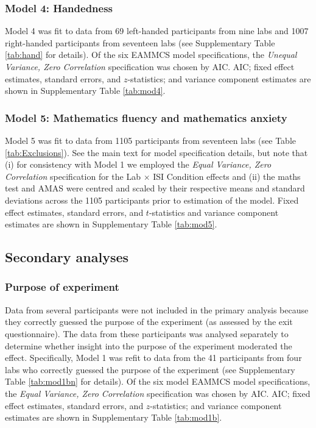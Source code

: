 \documentclass[A4paper,man,floatsintext]{apa6}
\theoremstyle{definition}
\theoremstyle{definition}
\theoremstyle{definition}
\theoremstyle{remark}
\begin{document}
\begin{appendix}
\subsubsection{Model 4: Handedness}\label{model-4-handedness}

Model 4 was fit to data from 69 left-handed participants from nine labs
and 1007 right-handed participants from seventeen labs (see
Supplementary Table \ref{tab:hand} for details). Of the six EAMMCS model
specifications, the \emph{Unequal Variance, Zero Correlation}
specification was chosen by AIC. AIC; fixed effect estimates, standard
errors, and \(z\)-statistics; and variance component estimates are shown
in Supplementary Table \ref{tab:mod4}.

\subsubsection{Model 5: Mathematics fluency and mathematics
anxiety}\label{model-5-mathematics-fluency-and-mathematics-anxiety}

Model 5 was fit to data from 1105 participants from seventeen labs (see
Table \ref{tab:Exclusions}). See the main text for model specification
details, but note that (i) for consistency with Model 1 we employed the
\emph{Equal Variance, Zero Correlation} specification for the Lab
\(\times\) ISI Condition effects and (ii) the maths test and AMAS were
centred and scaled by their respective means and standard deviations
across the 1105 participants prior to estimation of the model. Fixed
effect estimates, standard errors, and \(t\)-statistics and variance
component estimates are shown in Supplementary Table \ref{tab:mod5}.

\subsection{Secondary analyses}\label{secondary-analyses}

\subsubsection{Purpose of experiment}\label{purpose-of-experiment}

Data from several participants were not included in the primary analysis
because they correctly guessed the purpose of the experiment (as
assessed by the exit questionnaire). The data from these participants
was analysed separately to determine whether insight into the purpose of
the experiment moderated the effect. Specifically, Model 1 was refit to
data from the 41 participants from four labs who correctly guessed the
purpose of the experiment (see Supplementary Table \ref{tab:mod1bn} for
details). Of the six model EAMMCS model specifications, the \emph{Equal
Variance, Zero Correlation} specification was chosen by AIC. AIC; fixed
effect estimates, standard errors, and \(z\)-statistics; and variance
component estimates are shown in Supplementary Table \ref{tab:mod1b}.


\end{appendix}
\end{document}
